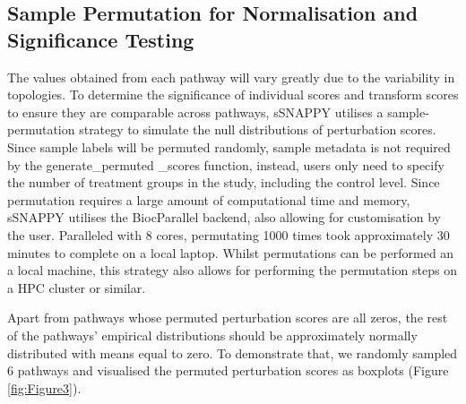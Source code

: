 \documentclass[9pt,a4paper,]{extarticle}
\newenvironment{Shaded}{\begin{snugshade}}{\end{snugshade}}
\newcommand{\AttributeTok}[1]{\textcolor[rgb]{0.77,0.63,0.00}{#1}}
\newcommand{\DecValTok}[1]{\textcolor[rgb]{0.00,0.00,0.81}{#1}}
\newcommand{\FunctionTok}[1]{\textcolor[rgb]{0.00,0.00,0.00}{#1}}
\newcommand{\NormalTok}[1]{#1}
\newcommand{\OtherTok}[1]{\textcolor[rgb]{0.56,0.35,0.01}{#1}}
\newcommand{\SpecialCharTok}[1]{\textcolor[rgb]{0.00,0.00,0.00}{#1}}
\begin{document}
\hypertarget{sample-permutation-for-normalisation-and-significance-testing}{%
\subsection{Sample Permutation for Normalisation and Significance Testing}\label{sample-permutation-for-normalisation-and-significance-testing}}

The values obtained from each pathway will vary greatly due to the variability in topologies.
To determine the significance of individual scores and transform scores to ensure they are comparable across pathways, sSNAPPY utilises a sample-permutation strategy to simulate the null distributions of perturbation scores.
Since sample labels will be permuted randomly, sample metadata is not required by the generate\_permuted \_scores function, instead, users only need to specify the number of treatment groups in the study, including the control level.
Since permutation requires a large amount of computational time and memory, sSNAPPY utilises the BiocParallel backend\citep{BiocParallel}, also allowing for customisation by the user.
Paralleled with 8 cores, permutating 1000 times took approximately 30 minutes to complete on a local laptop.
Whilst permutations can be performed an a local machine, this strategy also allows for performing the permutation steps on a HPC cluster or similar.

\begin{Shaded}
\end{Shaded}

Apart from pathways whose permuted perturbation scores are all zeros, the rest of the pathways' empirical distributions should be approximately normally distributed with means equal to zero.
To demonstrate that, we randomly sampled 6 pathways and visualised the permuted perturbation scores as boxplots (Figure \ref{fig:Figure3}).
\end{document}
